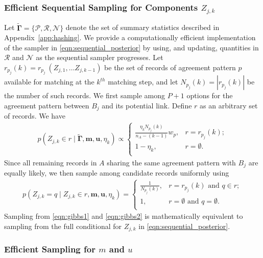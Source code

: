 \documentclass[12pt,letterpaper]{article}
\newcommand{\1}[1]{\mathbb{I}\!\left[#1\right]} %
\begin{document}
\subsubsection{Efficient Sequential Sampling for Components $Z_{j, k}$} \label{app:efficient-sampling}

Let $\tilde{\bm{\Gamma}}=\{ \mathcal{P}, \mathcal{R},\mathcal{N}\}$ denote the set of summary statistics described in Appendix~\ref{app:hashing}. We provide a computationally efficient implementation of the sampler in \eqref{eqn:sequential_posterior} by using, and updating, quantities in $\mathcal{R}$ and $\mathcal{N}$ as the sequential sampler progresses. Let $r_{p_j}(k) = r_{p_j} \ (Z_{j, 1}, \ldots Z_{j, k-1})$ be the set of records of agreement pattern $p$ available for matching at the $k^{th}$ matching step, and let $N_{p_j}(k) = |r_{p_j}(k)|$ be the number of such records. We first sample among $P + 1$ options for the agreement pattern between $B_j$ and its potential link. Define $r$ as an arbitrary set of records. We have
\begin{align}
	\label{eqn:gibbs1}
	p\left( Z_{j, k} \in r \mid \tilde{\bm{\Gamma}}, \bm{m}, \bm{u}, \eta_k \right) \propto
	\begin{cases} 
		\frac{\eta_k N_{p_j}(k)}{n_A - (k - 1)}  w_{p},  & r = r_{p_j}(k); \\
		1- \eta_k , &  r = \emptyset. \\
	\end{cases}
\end{align}
Since all remaining records in $A$ sharing the same agreement pattern with $B_j$ are equally likely, we then sample among candidate records uniformly using
\begin{align}
	\label{eqn:gibbs2}
	p\left(Z_{j, k} = q \mid Z_{j, k} \in r, \bm{m}, \bm{u}, \eta_k \right) = \begin{cases} 
		\frac{1}{N_{p_j}(k)}, & r = r_{p_j}(k) \text{ and } q \in r; \\
		1, & r = \emptyset \text{ and } q = \emptyset. \\
	\end{cases}
\end{align}
Sampling from \eqref{eqn:gibbs1} and \eqref{eqn:gibbs2} is mathematically equivalent to sampling from the full conditional for $Z_{j,k}$ in \eqref{eqn:sequential_posterior}.

\subsubsection{Efficient Sampling for $m$ and $u$} \label{app:efficient-m-and-u}
\end{document}
